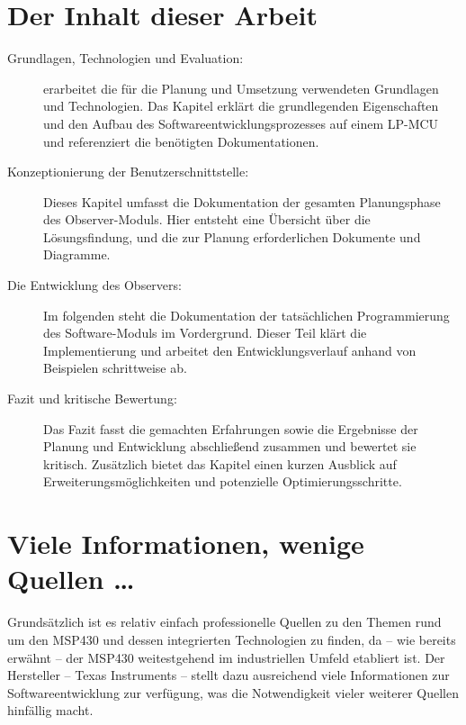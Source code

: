 \newpage
\section{Der Inhalt dieser Arbeit}
\label{sec:AufbauDieserArbeit}

\begin{description}

	\item[Grundlagen, Technologien und Evaluation:]  erarbeitet die f\"ur die Planung und Umsetzung verwendeten Grundlagen und Technologien. Das Kapitel erkl\"art die grundlegenden Eigenschaften und den Aufbau des Softwareentwicklungsprozesses auf einem LP-MCU und referenziert die ben\"otigten Dokumentationen.
	
	\item[Konzeptionierung der Benutzerschnittstelle:] Dieses Kapitel umfasst die Dokumentation der gesamten Planungsphase des Observer-Moduls. Hier entsteht eine \"Ubersicht \"uber die L\"osungsfindung, und die zur Planung erforderlichen Dokumente und Diagramme.
	
	\item[Die Entwicklung des Observers:] Im folgenden steht die Dokumentation der tats\"achlichen Programmierung des Software-Moduls im Vordergrund. Dieser Teil kl\"art die Implementierung und arbeitet den Entwicklungsverlauf anhand von Beispielen schrittweise ab.
	
	\item[Fazit und kritische Bewertung:] Das Fazit fasst die gemachten Erfahrungen sowie die Ergebnisse der Planung und Entwicklung abschlie{\ss}end zusammen und bewertet sie kritisch. Zus\"atzlich bietet das Kapitel einen kurzen Ausblick auf Erweiterungsm\"oglichkeiten und potenzielle Optimierungsschritte.

\end{description}

\section{Viele Informationen, wenige Quellen \dots}
\label{sec:Quellenlage}

Grunds\"atzlich ist es relativ einfach professionelle Quellen zu den Themen rund um den MSP430 und dessen integrierten Technologien zu finden, da -- wie bereits erw\"ahnt -- der MSP430 weitestgehend im industriellen Umfeld etabliert ist. Der Hersteller -- Texas Instruments -- stellt dazu ausreichend viele Informationen zur Softwareentwicklung zur verf\"ugung, was die Notwendigkeit vieler weiterer Quellen hinf\"allig macht.